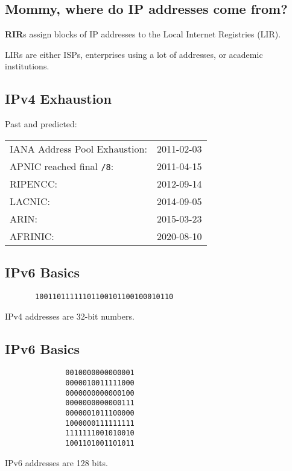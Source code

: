 \documentclass[xga]{xdvislides}
\begin{document}
\subsection{Mommy, where do IP addresses come from?}
\vspace*{\fill}
\begin{center}
{\bf RIR}s assign blocks of IP addresses to the Local Internet Registries (LIR).
\\
\vspace{.5in}

LIRs are either ISPs, enterprises using a lot of addresses, or academic
institutions.
\end{center}
\vspace*{\fill}

\subsection{IPv4 Exhaustion}
Past and predicted: \\

\begin{tabular}{l r}
IANA Address Pool Exhaustion: & 2011-02-03 \\
APNIC reached final {\tt /8}: & 2011-04-15 \\
RIPENCC: & 2012-09-14 \\
LACNIC: & 2014-09-05 \\
ARIN: & 2015-03-23 \\
AFRINIC: & 2020-08-10 \\
\end{tabular}

\subsection{IPv6 Basics}
\vspace{.5in}
\Hugesize
\begin{center}
\begin{verbatim}
       10011011111101100101100100010110
\end{verbatim}
\vspace{.5in}
IPv4 addresses are 32-bit numbers.
\end{center}
\Normalsize


\subsection{IPv6 Basics}
\Hugesize
\begin{center}
\begin{verbatim}
              0010000000000001
              0000010011111000
              0000000000000100
              0000000000000111
              0000001011100000
              1000000111111111
              1111111001010010
              1001101001101011
\end{verbatim}
\vspace{.5in}
IPv6 addresses are 128 bits.
\end{center}
\Normalsize
\end{document}

